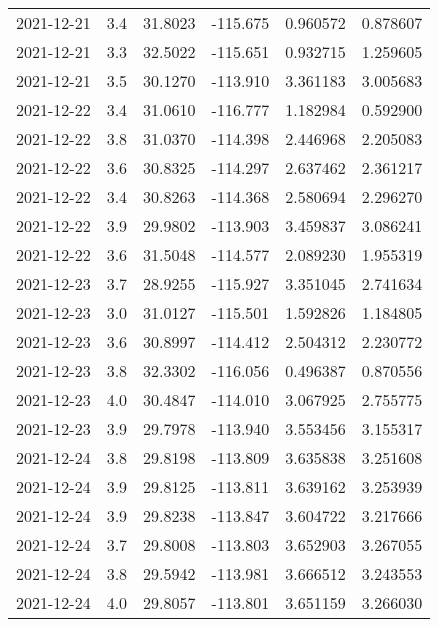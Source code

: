 \begin{tabular}{lrrrrr}
2021-12-21 &       3.4 &  31.8023 &  -115.675 &         0.960572 &         0.878607 \\
2021-12-21 &       3.3 &  32.5022 &  -115.651 &         0.932715 &         1.259605 \\
2021-12-21 &       3.5 &  30.1270 &  -113.910 &         3.361183 &         3.005683 \\
2021-12-22 &       3.4 &  31.0610 &  -116.777 &         1.182984 &         0.592900 \\
2021-12-22 &       3.8 &  31.0370 &  -114.398 &         2.446968 &         2.205083 \\
2021-12-22 &       3.6 &  30.8325 &  -114.297 &         2.637462 &         2.361217 \\
2021-12-22 &       3.4 &  30.8263 &  -114.368 &         2.580694 &         2.296270 \\
2021-12-22 &       3.9 &  29.9802 &  -113.903 &         3.459837 &         3.086241 \\
2021-12-22 &       3.6 &  31.5048 &  -114.577 &         2.089230 &         1.955319 \\
2021-12-23 &       3.7 &  28.9255 &  -115.927 &         3.351045 &         2.741634 \\
2021-12-23 &       3.0 &  31.0127 &  -115.501 &         1.592826 &         1.184805 \\
2021-12-23 &       3.6 &  30.8997 &  -114.412 &         2.504312 &         2.230772 \\
2021-12-23 &       3.8 &  32.3302 &  -116.056 &         0.496387 &         0.870556 \\
2021-12-23 &       4.0 &  30.4847 &  -114.010 &         3.067925 &         2.755775 \\
2021-12-23 &       3.9 &  29.7978 &  -113.940 &         3.553456 &         3.155317 \\
2021-12-24 &       3.8 &  29.8198 &  -113.809 &         3.635838 &         3.251608 \\
2021-12-24 &       3.9 &  29.8125 &  -113.811 &         3.639162 &         3.253939 \\
2021-12-24 &       3.9 &  29.8238 &  -113.847 &         3.604722 &         3.217666 \\
2021-12-24 &       3.7 &  29.8008 &  -113.803 &         3.652903 &         3.267055 \\
2021-12-24 &       3.8 &  29.5942 &  -113.981 &         3.666512 &         3.243553 \\
2021-12-24 &       4.0 &  29.8057 &  -113.801 &         3.651159 &         3.266030 \\

\end{tabular}

